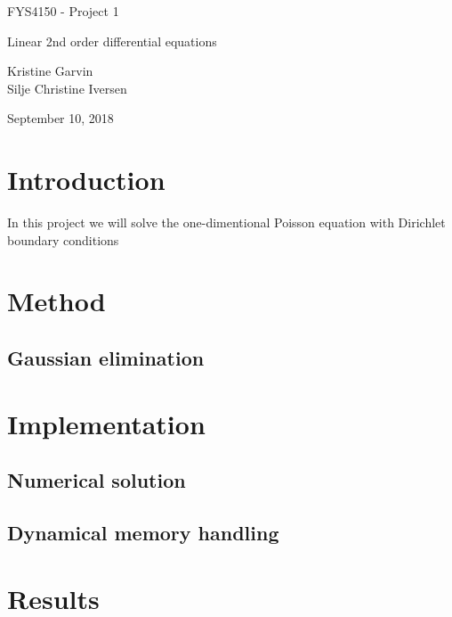 \documentclass[norsk]{article}
\begin{document}
	\vspace*{1cm}
	\begin{center}
	{\huge FYS4150 - Project 1 \par}
	{\huge Linear 2nd order differential equations\par}
	\vspace{0.5cm}
	{\Large Kristine Garvin \\ Silje Christine Iversen \par}	
	\vspace{0.5cm}
	{\Large September 10, 2018 \par}
	\vspace{1cm}
	\end{center}
	
\section{Introduction}
In this project we will solve the one-dimentional Poisson equation with Dirichlet boundary conditions

\section{Method}
\subsection{Gaussian elimination}
\section{Implementation}
\subsection{Numerical solution}
\subsection{Dynamical memory handling}
\section{Results}
\end{document}

